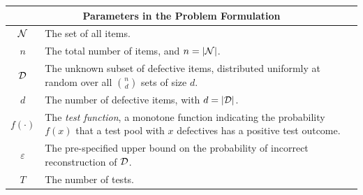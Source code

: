 \documentclass[onecolumn,letterpaper]{IEEEtran}
\newcommand{\cN}{{\cal N}}
\newcommand{\cD}{{\cal D}}
\begin{document}
\begin{table}
    \centering
    \begin{tabular}{|c|l|}
        \hline
        \multicolumn{2}{|c|}{{\bf Parameters in the Problem Formulation}}
        \\\hline
        $\cN$ & The set of all items.
        \\\hline
        $n$ & The total number of items, and $n = |\cN|$.
        \\\hline
        $\cD$ & The unknown subset of defective items, distributed uniformly at random over all $\binom{n}{d}$ sets of size $d$.
        \\\hline
        $d$ & The number of defective items, with $d = |\cD|$.
        \\\hline
        $f(\cdot)$ & The {\it test function}, a monotone function indicating the probability $f(x)$ that a test pool with $x$ defectives has a positive test outcome.
        \\\hline
        $\varepsilon$ & The pre-specified upper bound on the probability of incorrect reconstruction of $\cD$.
        \\\hline
        $T$ & The number of tests.
        \\\hline
        

\end{tabular}
\end{table}
\end{document}
